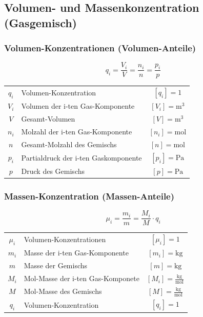 \subsection{Volumen- und Massenkonzentration (Gasgemisch)}


\subsubsection{Volumen-Konzentrationen (Volumen-Anteile)}


$$ \boxed{  q_i = \frac{V_i}{V} = \frac{n_i}{n} = \frac{p_i}{p} } $$


\begin{tabular}{c l c}
	$q_i$ & Volumen-Konzentration& $[q_i] = 1$ \\
	$V_i$ & Volumen der i-ten Gas-Komponente & $[V_i] = \mathrm{m^3}$ \\
	$V$ & Gesamt-Volumen & $[V] = \mathrm{m^3}$ \\
	$n_i$ & Molzahl der i-ten Gas-Komponente & $[n_i] = \mathrm{mol}$ \\
	$n$ & Gesamt-Molzahl des Gemischs & $[n] = \mathrm{mol}$ \\
	$p_i$ & Partialdruck der i-ten Gaskomponente & $[p_i] = \mathrm{Pa}$ \\
	$p$ & Druck des Gemischs & $[p] = \mathrm{Pa}$ \\
\end{tabular}






\subsubsection{Massen-Konzentration (Massen-Anteile)}

$$ \boxed{ \mu_i = \frac{m_i}{m} = \frac{M_i}{M} \cdot q_i } $$


\begin{tabular}{c l c}
	$\mu_i$ & Volumen-Konzentrationen & $[\mu_i] = 1$ \\
	$m_i$ & Masse der i-ten Gas-Komponente & $[m_i] = \mathrm{kg}$ \\
	$m$ & Masse der Gemischs & $[m] = \mathrm{kg}$ \\
	\rule{0pt}{8pt}$M_i$ & Mol-Masse der i-ten Gas-Komponete & $[M_i] = \mathrm{\frac{kg}{mol}}$ \\
	\rule{0pt}{8pt}$M$ & Mol-Masse des Gemischs & $[M] = \mathrm{\frac{kg}{mol}}$ \\
	$q_i$ & Volumen-Konzentration& $[q_i] = 1$ \\
\end{tabular}



